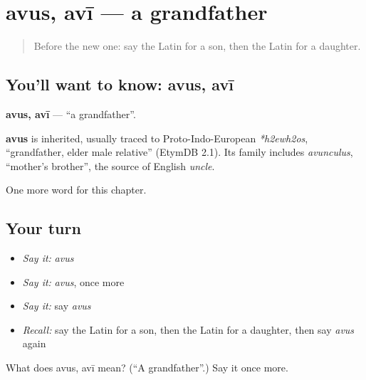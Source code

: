 \section[avus, avī]{avus, avī — a grandfather}

\label{lesson:LA-C70-avus}



\begin{quote}
Before the new one: say the Latin for a son, then the Latin for a daughter.
\end{quote}

\subsection*{You'll want to know: avus, avī}
\textbf{avus, avī} — \textquotedblleft{}a grandfather\textquotedblright{}.

\begin{cousinweb}
\textbf{avus} is inherited, usually traced to Proto-Indo-European \emph{*h2ewh2os}, \textquotedblleft{}grandfather, elder male relative\textquotedblright{} (EtymDB 2.1). Its family includes \emph{avunculus}, \textquotedblleft{}mother's brother\textquotedblright{}, the source of English \emph{uncle}.
\end{cousinweb}

\begin{grammarlens}[title={What you've built}]
One more word for this chapter.
\end{grammarlens}

\subsection*{Your turn}
\begin{itemize}
\raggedright
  \item \emph{Say it:} \emph{avus}
  \item \emph{Say it:} \emph{avus}, once more
  \item \emph{Say it:} say \emph{avus}
  \item \emph{Recall:} say the Latin for a son, then the Latin for a daughter, then say \emph{avus} again
\end{itemize}

\begin{tcolorbox}[breakable,colback=teal!4,colframe=teal!35!black,title={Before you move on}]
What does avus, avī mean? (\textquotedblleft{}A grandfather\textquotedblright{}.) Say it once more.
\end{tcolorbox}
